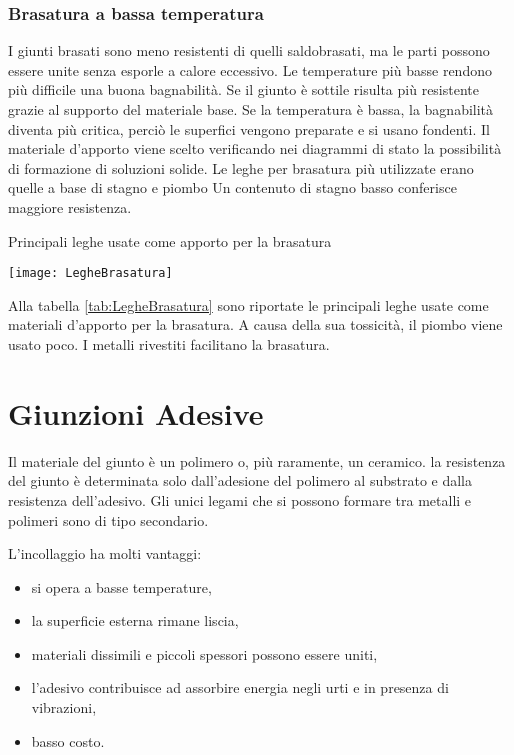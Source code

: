 \subsection{Brasatura a bassa temperatura}
I giunti brasati sono meno resistenti di quelli saldobrasati, ma le parti possono essere unite senza esporle a calore eccessivo.
Le temperature più basse rendono più difficile una buona bagnabilità.
Se il giunto è sottile risulta più resistente grazie al supporto del materiale base.
Se la temperatura è bassa, la bagnabilità diventa più critica, perciò le superfici vengono preparate e si usano fondenti.
Il materiale d'apporto viene scelto verificando nei diagrammi di stato la possibilità di formazione di soluzioni solide.
Le leghe per brasatura più utilizzate erano quelle a base di stagno e piombo
Un contenuto di stagno basso conferisce maggiore resistenza.

\begin{table}
\centering
\caption{Principali leghe usate come apporto per la brasatura}
\label{tab:LegheBrasatura}
\texttt{[image: LegheBrasatura]}
\end{table}

Alla tabella \ref{tab:LegheBrasatura} sono riportate le principali leghe usate come materiali d'apporto per la brasatura.
A causa della sua tossicità, il piombo viene usato poco.
I metalli rivestiti facilitano la brasatura.

\chapter{Giunzioni Adesive}
Il materiale del giunto è un polimero o, più raramente, un ceramico.
la resistenza del giunto è determinata solo dall'adesione del polimero al substrato e dalla resistenza dell'adesivo.
Gli unici legami che si possono formare tra metalli e polimeri sono di tipo secondario.

L'incollaggio ha molti vantaggi:
\begin{itemize}
\item si opera a basse temperature,
\item la superficie esterna rimane liscia,
\item materiali dissimili e piccoli spessori possono essere uniti,
\item  l'adesivo contribuisce ad assorbire energia negli urti e in presenza di vibrazioni,
\item basso costo.
\end{itemize}

